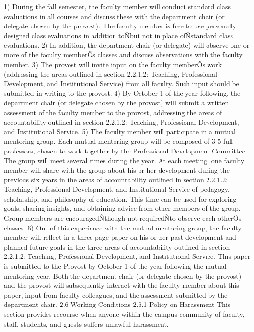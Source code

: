 \documentclass[letterpaper, 11pt]{article}
\begin{document}
	1) During the fall semester, the faculty member will conduct standard class evaluations in all courses and discuss these with the department chair (or delegate chosen by the provost). The faculty member is free to use personally designed class evaluations in addition toÑbut not in place ofÑstandard class evaluations.
	2) In addition, the department chair (or delegate) will observe one or more of the faculty memberÕs classes and discuss observations with the faculty member.
	3) The provost will invite input on the faculty memberÕs work (addressing the areas outlined in section 2.2.1.2: Teaching, Professional Development, and Institutional Service) from all faculty. Such input should be submitted in writing to the provost.
	4) By October 1 of the year following, the department chair (or delegate chosen by the provost) will submit a written assessment of the faculty member to the provost, addressing the areas of accountability outlined in section 2.2.1.2: Teaching, Professional Development, and Institutional Service.
	5) The faculty member will participate in a mutual mentoring group. Each mutual mentoring group will be composed of 3-5 full professors, chosen to work together by the Professional Development Committee. The group will meet several times during the year. At each meeting, one faculty member will share with the group about his or her development during the previous six years in the areas of accountability outlined in section 2.2.1.2: Teaching, Professional Development, and Institutional Service of pedagogy, scholarship, and philosophy of education. This time can be used for exploring goals, sharing insights, and obtaining advice from other members of the group. Group members are encouragedÑthough not requiredÑto observe each otherÕs classes.
	6) Out of this experience with the mutual mentoring group, the faculty member will reflect in a three-page paper on his or her past development and planned future goals in the three areas of accountability outlined in section 2.2.1.2: Teaching, Professional Development, and Institutional Service. This paper is submitted to the Provost by October 1 of the year following the mutual mentoring year. Both the department chair (or delegate chosen by the provost) and the provost will subsequently interact with the faculty member about this paper, input from faculty colleagues, and the assessment submitted by the department chair.
	2.6 Working Conditions
	2.6.1 Policy on Harassment
	This section provides recourse when anyone within the campus community of faculty, staff, students, and guests suffers unlawful harassment.
\end{document}
